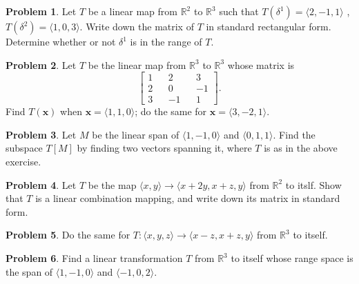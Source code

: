 \documentclass[]{article}
\newcommand{\RR}{\mathbb{R}}
\theoremstyle{definition}
\newtheorem{problem}{Problem}
\begin{document}
\begin{problem}
	Let $T$ be a linear map from $\RR^2$ to $\RR^3$ such that $T(\delta^1) = \langle 2, -1, 1 \rangle$ , $T(\delta^2) = \langle 1,0,3 \rangle$. Write down the matrix of $T$ in standard rectangular form. Determine whether or not $\delta^1$ is in the range of $T$.	
\end{problem}
\begin{problem}
Let $T$ be the linear map from $\RR^3$ to $\RR^3$ whose matrix is
\[
\begin{bmatrix}
	1 && 2 && 3 \\	
	2 && 0 && -1 \\
	3 && -1 && 1
\end{bmatrix}.
\]
Find $T( \bm x)$ when $\bm x = \langle 1, 1, 0 \rangle$; do the same for $\bm x = \langle 3, -2, 1 \rangle$.
\end{problem}
\begin{problem}
	Let $M$ be the linear span of $\langle 1, -1, 0 \rangle$ and $\langle 0, 1, 1 \rangle$. Find the subspace $T[M]$ by finding two vectors spanning it, where $T$ is as in the above exercise.
\end{problem}
\begin{problem}
	Let $T$ be the map $\langle x, y \rangle \to \langle x+2y, x+z, y \rangle$ from $\RR^2$ to itslf. Show that $T$ is a linear combination mapping, and write down its matrix in standard form.
\end{problem}
\begin{problem}
	
	Do the same for $T: \langle x, y , z \rangle \to \langle x-z, x+z,y \rangle$ from $\RR^3$ to itself.
\end{problem}
\begin{problem}
	Find a linear transformation $T$ from $\RR^3$ to itself whose range space is the span of $\langle1, -1, 0 \rangle$ and $\langle -1, 0 ,2 \rangle$.	
\end{problem}
\end{document}
